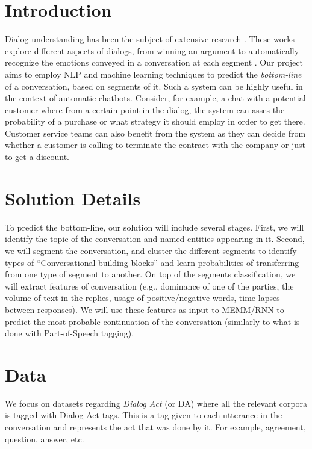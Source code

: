 \section{Introduction}
Dialog understanding has been the subject of 
extensive research \cite{BohusR03,BordesW16,GhazvininejadBC17,ShawarA03,DBLP:conf/coling/1996,DBLP:conf/icassp/2005}. These works explore 
different aspects of dialogs, from winning an argument \cite{TanNDL16} 
to automatically recognize the emotions conveyed in a conversation at each segment \cite{AyadiKK11}. 
Our project aims to employ NLP and machine learning techniques to 
predict the {\em bottom-line} of a conversation, based on segments 
of it. Such a system can be highly useful in the context of automatic 
chatbots. Consider, for example, a chat with a potential customer where 
from a certain point in the dialog, the system can asses the probability of a purchase 
or what strategy it should employ in order to get there. 
Customer service teams can also benefit from the system as they can decide 
from whether a customer is calling to terminate the contract with the company 
or just to get a discount.

\section{Solution Details}
To predict the bottom-line, our solution will include several stages. 
First, we will identify the topic of the conversation and named entities 
appearing in it. Second, we will segment the conversation, 
and cluster the different segments to identify types of 
``Conversational building blocks'' and learn probabilities 
of transferring from one type of segment to another. 
On top of the segments classification, we will extract features of 
conversation (e.g., dominance of one of the parties, 
the volume of text in the replies, usage of positive/negative words, 
time lapses between responses). 
We will use these features as input to MEMM/RNN to predict the 
most probable continuation of the conversation 
(similarly to what is done with Part-of-Speech tagging). 


\section{Data}
We focus on datasets regarding {\em Dialog Act} (or DA) where all the relevant corpora is tagged with Dialog Act tags. 
This is a tag given to each utterance in the conversation and represents the act that was done by it. 
For example, agreement, question, answer, etc.

